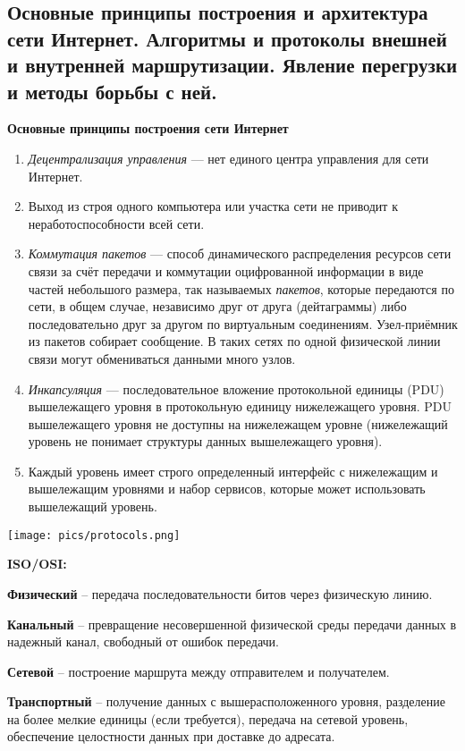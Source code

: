 \subsection{Основные  принципы  построения  и  архитектура  сети  Интернет.  Алгоритмы  и  протоколы  внешней  и внутренней маршрутизации. Явление перегрузки и методы борьбы с ней.}

\textbf{Основные принципы построения сети Интернет}

\begin{enumerate}
    \item \textit{Децентрализация управления} --- нет единого центра управления для сети Интернет.
    \item Выход из строя одного компьютера или участка сети не приводит к неработоспособности всей сети.
    \item \textit{Коммутация пакетов} --- способ динамического распределения ресурсов сети связи за счёт передачи и коммутации оцифрованной информации в виде частей небольшого размера, так называемых \textit{пакетов}, которые передаются по сети, в общем случае, независимо друг от друга (дейтаграммы) либо последовательно друг за другом по виртуальным соединениям. 
    Узел-приёмник из пакетов собирает сообщение. 
    В таких сетях по одной физической линии связи могут обмениваться данными много узлов.
    \item \textit{Инкапсуляция} --- последовательное вложение протокольной единицы (PDU) вышележащего уровня в протокольную единицу нижележащего уровня. 
    PDU вышележащего уровня не доступны на нижележащем уровне (нижележащий уровень не понимает структуры данных вышележащего уровня).
    \item Каждый уровень имеет строго определенный интерфейс с нижележащим и вышележащим уровнями и набор сервисов, которые может использовать вышележащий уровень.
\end{enumerate}

\bigbreak
\texttt{[image: pics/protocols.png]}

\textbf{ISO/OSI:}

\textbf{Физический} -- передача последовательности битов через физическую линию.

\textbf{Канальный} -- превращение несовершенной физической среды передачи данных в надежный канал, свободный от ошибок передачи.

\textbf{Сетевой} -- построение маршрута между отправителем и получателем.

\textbf{Транспортный} -- получение данных с вышерасположенного уровня, разделение на более мелкие единицы (если требуется), передача на сетевой уровень, обеспечение целостности данных при доставке до адресата.

